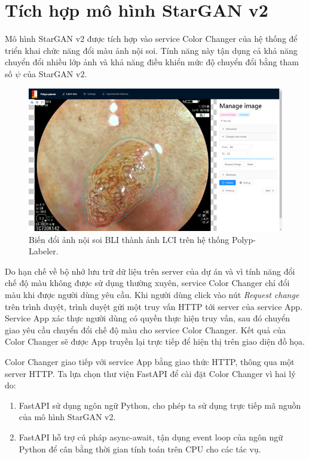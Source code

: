 \documentclass[12pt]{extreport}
\begin{document}
\section{Tích hợp mô hình StarGAN v2}

Mô hình StarGAN v2 được tích hợp vào service Color Changer của hệ thống để triển khai chức năng đổi màu ảnh nội soi. Tính năng này tận dụng cả khả năng chuyển đổi nhiều lớp ảnh và khả năng điều khiển mức độ chuyển đổi bằng tham số $ \psi $ của StarGAN v2.

\begin{figure}[H]
    \centering
    \includegraphics[width=0.7\linewidth]{figure42png.png}
    \caption{Biến đổi ảnh nội soi BLI thành ảnh LCI trên hệ thống Polyp-Labeler.}
\end{figure}

Do hạn chế về bộ nhớ lưu trữ dữ liệu trên server của dự án và vì tính năng đổi chế độ màu không được sử dụng thường xuyên, service Color Changer chỉ đổi màu khi được người dùng yêu cầu. Khi người dùng click vào nút \textit{Request change} trên trình duyệt, trình duyệt gửi một truy vấn HTTP tới server của service App. Service App xác thực người dùng có quyền thực hiện truy vấn, sau đó chuyển giao yêu cầu chuyển đổi chế độ màu cho service Color Changer. Kết quả của Color Changer sẽ được App truyền lại trực tiếp để hiện thị trên giao diện đồ họa.

Color Changer giao tiếp với service App bằng giao thức HTTP, thông qua một server HTTP. Ta lựa chọn thư viện FastAPI để cài đặt Color Changer vì hai lý do:
\begin{enumerate}
    \item FastAPI sử dụng ngôn ngữ Python, cho phép ta sử dụng trực tiếp mã nguồn của mô hình StarGAN v2.
    \item FastAPI hỗ trợ cú pháp async-await, tận dụng event loop của ngôn ngữ Python để cân bằng thời gian tính toán trên CPU cho các tác vụ.
\end{enumerate}
\end{document}
